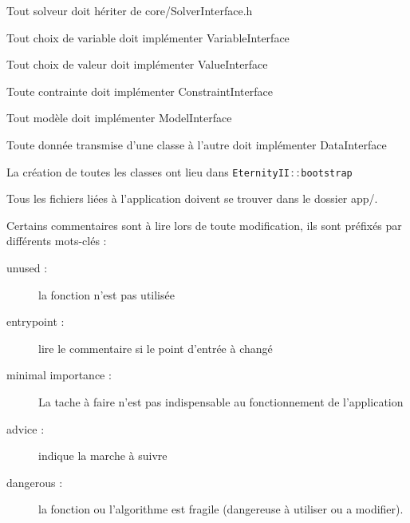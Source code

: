 Tout solveur doit hériter de core/SolverInterface.h

Tout choix de variable doit implémenter VariableInterface

Tout choix de valeur doit implémenter ValueInterface

Toute contrainte doit implémenter ConstraintInterface

Tout modèle doit implémenter ModelInterface

Toute donnée transmise d'une classe à l'autre doit implémenter DataInterface

La création de toutes les classes ont lieu dans \lstinline[language=c++]|EternityII::bootstrap|

Tous les fichiers liées à l'application doivent se trouver dans le dossier app/.

Certains commentaires sont à lire lors de toute modification, ils sont préfixés par différents mots-clés :

\begin{description}
	\item[unused :] la fonction n'est pas utilisée
	\item[entrypoint :] lire le commentaire si le point d'entrée à changé
	\item[minimal importance :] La tache à faire n'est pas indispensable au fonctionnement de l'application
	\item[advice :] indique la marche à suivre
	\item[dangerous :] la fonction ou l'algorithme est fragile (dangereuse à utiliser ou a modifier).
\end{description}